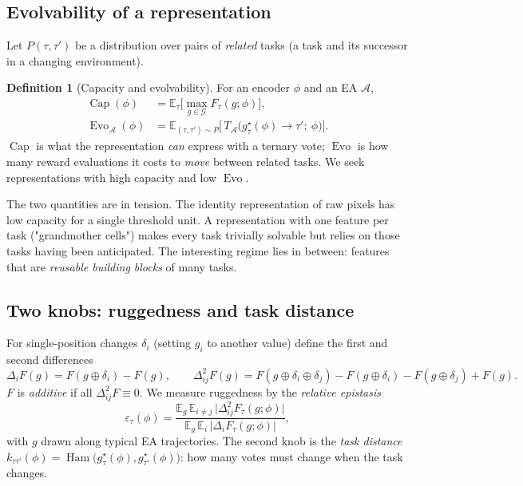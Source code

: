 \documentclass[11pt,a4paper]{article}
\theoremstyle{definition}
\newtheorem{definition}{Definition}[section]
\theoremstyle{plain}
\theoremstyle{remark}
\newcommand{\E}{\mathbb{E}}
\newcommand{\Gen}{\mathcal{G}}          %
\newcommand{\Ham}{\operatorname{Ham}}
\newcommand{\Evo}{\operatorname{Evo}}
\newcommand{\Capa}{\operatorname{Cap}}
\begin{document}
\subsection{Evolvability of a representation}

Let $P(\tau,\tau')$ be a distribution over pairs of \emph{related} tasks (a task and its successor in a changing environment).

\begin{definition}[Capacity and evolvability]
\label{def:evo}
For an encoder $\phi$ and an EA $\mathcal{A}$,
\begin{align}
\Capa(\phi) &= \E_{\tau}\Big[\max_{g\in\Gen} F_\tau(g;\phi)\Big], \\
\Evo_\mathcal{A}(\phi) &= \E_{(\tau,\tau')\sim P}\Big[\,T_\mathcal{A}\big(g^\star_\tau(\phi)\to\tau';\ \phi\big)\Big].
\end{align}
$\Capa$ is what the representation \emph{can} express with a ternary vote; $\Evo$ is how many reward evaluations it costs to \emph{move} between related tasks. We seek representations with high capacity and low $\Evo$.
\end{definition}

The two quantities are in tension. The identity representation of raw pixels has low capacity for a single threshold unit. A representation with one feature per task ("grandmother cells") makes every task trivially solvable but relies on those tasks having been anticipated. The interesting regime lies in between: features that are \emph{reusable building blocks} of many tasks.

\subsection{Two knobs: ruggedness and task distance}

For single-position changes $\delta_i$ (setting $g_i$ to another value) define the first and second differences
\begin{equation}
\Delta_i F(g) = F(g\oplus\delta_i) - F(g),\qquad
\Delta^2_{ij} F(g) = F(g\oplus\delta_i\oplus\delta_j) - F(g\oplus\delta_i) - F(g\oplus\delta_j) + F(g).
\end{equation}
$F$ is \emph{additive} if all $\Delta^2_{ij}F\equiv 0$. We measure ruggedness by the \emph{relative epistasis}
\begin{equation}
\varepsilon_\tau(\phi) = \frac{\E_{g}\,\E_{i\neq j}\,\big|\Delta^2_{ij}F_\tau(g;\phi)\big|}{\E_g\,\E_i\,\big|\Delta_iF_\tau(g;\phi)\big|},
\end{equation}
with $g$ drawn along typical EA trajectories. The second knob is the \emph{task distance} $k_{\tau\tau'}(\phi) = \Ham\big(g^\star_\tau(\phi), g^\star_{\tau'}(\phi)\big)$: how many votes must change when the task changes.
\end{document}
